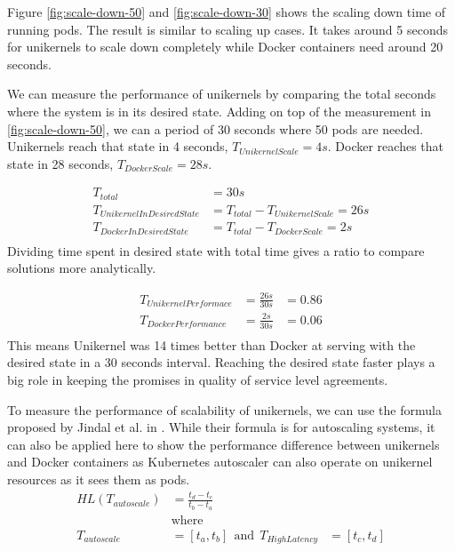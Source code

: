 Figure \ref{fig:scale-down-50} and \ref{fig:scale-down-30} shows the scaling down time of running pods. The result is similar to scaling up cases. It takes around 5 seconds for unikernels to scale down completely while Docker containers need around 20 seconds.

We can measure the performance of unikernels by comparing the total seconds where the system is in its desired state. Adding on top of the measurement in \ref{fig:scale-down-50}, we can a period of 30 seconds where 50 pods are needed. Unikernels reach that state in 4 seconds, \(T_{UnikernelScale}=4s\). Docker reaches that state in 28 seconds, \(T_{DockerScale}=28s\).

\begin{equation*}
  \begin{aligned}
    T_{total}&=30s \\
    T_{UnikernelInDesiredState}&=T_{total}-T_{UnikernelScale}=26s \\
    T_{DockerInDesiredState}&=T_{total}-T_{DockerScale}=2s\\
  \end{aligned}
\end{equation*}
Dividing time spent in desired state with total time gives a ratio to compare solutions more analytically.

\begin{equation*}
  \begin{aligned}
    T_{UnikernelPerformace}&=\frac{26s}{30s}&=0.86 \\
    T_{DockerPerformance}&=\frac{2s}{30s}&=0.06 \\
  \end{aligned}
  \end{equation*}
This means Unikernel was 14 times better than Docker at serving with the desired state in a 30 seconds interval. Reaching the desired state faster plays a big role in keeping the promises in quality of service level agreements.

  \iffalse
To measure the performance of scalability of unikernels, we can use the formula proposed by Jindal et al. in \cite{multilayered}. While their formula is for autoscaling systems, it can also be applied here to show the performance difference between unikernels and Docker containers as Kubernetes autoscaler can also operate on unikernel resources as it sees them as pods.
\begin{equation*}
  \begin{aligned}
  HL(T_{autoscale})&=\frac{t_d-t_c}{t_b-t_a} \\
  &\textrm{where} \\ 
  T_{autoscale}&=[t_a,t_b] \ \ \textrm{and} \ \ T_{HighLatency}&=[t_c,t_d]
  \end{aligned}
\end{equation*}

